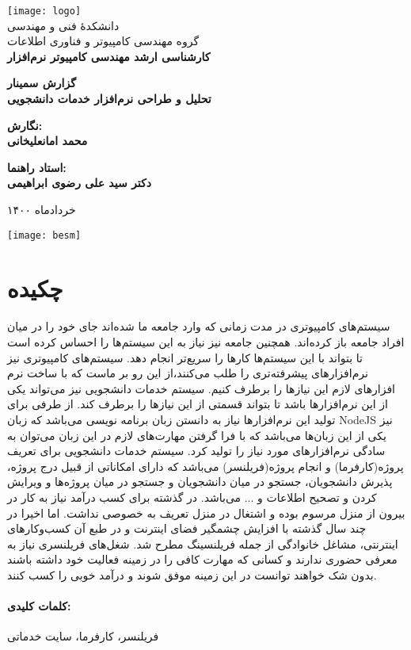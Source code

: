 
\begin{titlepage}
	\centering
	\texttt{[image: logo]}
	\\[10pt]
	{\Large
		دانشکدۀ ‫فنی و مهندسی
		\\[10pt]
		گروه ‫مهندسی کامپیوتر و فناوری اطلاعات
		\\[15pt] \bfseries
		کارشناسی ارشد مهندسی کامپیوتر نرم‌افزار
	‬‫‬‬}

	\vfill
	{\Large \bfseries
		گزارش سمینار
	} \\[10pt]
	{\huge	\bfseries
			تحلیل و طراحی نرم‌افزار خدمات دانشجویی
	}

	\vfill
	{\large \bfseries
	نگارش:
	\\[10pt]
	محمد  امانعلیخانی
	}

	\vfill
	{\large \bfseries
			استاد راهنما:
			\\[10pt]
			دکتر سید علی رضوی ابراهیمی
	}

	\vfill
	{\large خرداد‌ماه ۱۴۰۰}



\end{titlepage}


\thispagestyle{empty}
\begin{minipage}[c][\textheight][c]{\textwidth}%
	\centering
	\texttt{[image: besm]}
\end{minipage}%

\section*{چکیده}
سیستم‌های کامپیوتری در مدت زمانی که وارد جامعه ما شده‌اند جای خود را در میان افراد جامعه باز کرده‌اند.
همچنین جامعه نیز نیاز به این سیستم‌ها را احساس کرده است تا بتواند با این  سیستم‌ها  کارها را سریع‌تر انجام دهد.
سیستم‌های کامپیوتری نیز نرم‌افزارهای پیشرفته‌تری را طلب می‌کنند،از این رو بر ماست که با ساخت نرم افزارهای لازم این نیازها را برطرف کنیم.
سیستم خدمات دانشجویی نیز می‌تواند یکی از این نرم‌افزارها باشد تا بتواند قسمتی از این نیازها را برطرف کند.
از طرفی برای تولید این نرم‌افزارها نیاز به دانستن زبان‌ برنامه نویسی می‌باشد که زبان NodeJS نیز یکی از این زبان‌ها می‌باشد که با فرا گرفتن مهارت‌های لازم در این زبان می‌توان به سادگی نرم‌افزارهای مورد نیاز را تولید کرد.
سیستم خدمات دانشجویی برای تعریف پروژه(کارفرما) و انجام پروژه(فریلنسر) می‌باشد که دارای امکاناتی از قبیل درج پروژه، پذیرش دانشجویان، جستجو در میان دانشجویان و جستجو در میان پروژه‌ها و ویرایش کردن و تصحیح اطلاعات و ... می‌باشد.
در گذشته برای کسب درآمد نیاز به کار در بیرون از منزل مرسوم بوده و اشتغال در منزل تعریف به خصوصی نداشت.
اما اخیرا در چند سال گذشته با افزایش چشمگیر فضای اینترنت و در طبع آن کسب‌وکارهای اینترنتی، مشاغل خانوادگی از جمله فریلنسینگ مطرح شد.
شغل‌های فریلنسری نیاز به معرفی حضوری ندارند و کسانی که مهارت کافی را در زمینه فعالیت خود داشته باشند بدون شک خواهند توانست در این زمینه موفق شوند و درآمد خوبی را کسب کنند.
\paragraph{کلمات کلیدی:}
فریلنسر، کارفرما، سایت خدماتی

\thispagestyle{empty}
\pagestyle{plain}
\setcounter{page}{1}
\clearpage










